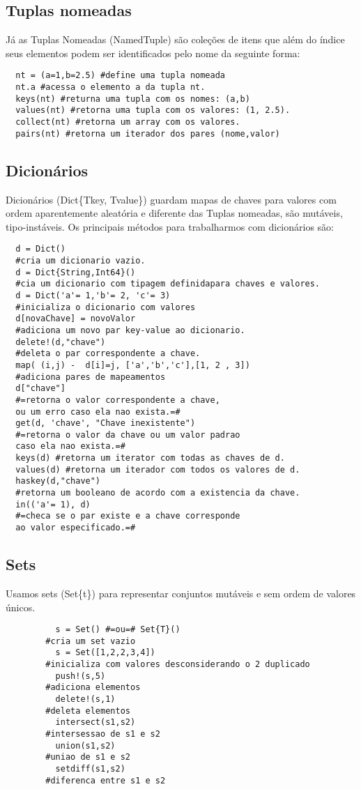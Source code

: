 \subsection{Tuplas nomeadas}
Já as Tuplas Nomeadas (NamedTuple) são coleções de itens que além do índice seus elementos podem ser identificados pelo nome da seguinte forma: 
\begin{lstlisting}
  nt = (a=1,b=2.5) #define uma tupla nomeada
  nt.a #acessa o elemento a da tupla nt.
  keys(nt) #returna uma tupla com os nomes: (a,b)
  values(nt) #retorna uma tupla com os valores: (1, 2.5).
  collect(nt) #retorna um array com os valores.
  pairs(nt) #retorna um iterador dos pares (nome,valor) 
\end{lstlisting}

\subsection{Dicionários}
Dicionários (Dict\{Tkey, Tvalue\}) guardam mapas de chaves para valores com ordem aparentemente aleatória e diferente das Tuplas nomeadas, são mutáveis, tipo-instáveis.
Os principais métodos para trabalharmos com dicionários são:
\begin{lstlisting}
  d = Dict() 
  #cria um dicionario vazio.
  d = Dict{String,Int64}() 
  #cia um dicionario com tipagem definidapara chaves e valores.
  d = Dict('a'= 1,'b'= 2, 'c'= 3) 
  #inicializa o dicionario com valores
  d[novaChave] = novoValor 
  #adiciona um novo par key-value ao dicionario.
  delete!(d,"chave") 
  #deleta o par correspondente a chave.
  map( (i,j) -  d[i]=j, ['a','b','c'],[1, 2 , 3]) 
  #adiciona pares de mapeamentos
  d["chave"] 
  #=retorna o valor correspondente a chave, 
  ou um erro caso ela nao exista.=#
  get(d, 'chave', "Chave inexistente") 
  #=retorna o valor da chave ou um valor padrao 
  caso ela nao exista.=# 
  keys(d) #retorna um iterator com todas as chaves de d.
  values(d) #retorna um iterador com todos os valores de d.
  haskey(d,"chave") 
  #retorna um booleano de acordo com a existencia da chave.
  in(('a'= 1), d) 
  #=checa se o par existe e a chave corresponde 
  ao valor especificado.=#

\end{lstlisting}

\subsection{Sets}
Usamos sets (Set\{t\}) para representar conjuntos mutáveis e sem ordem de valores únicos.
    \begin{lstlisting}
          s = Set() #=ou=# Set{T}() 
        #cria um set vazio
          s = Set([1,2,2,3,4]) 
        #inicializa com valores desconsiderando o 2 duplicado
          push!(s,5) 
        #adiciona elementos
          delete!(s,1)
        #deleta elementos
          intersect(s1,s2) 
        #intersessao de s1 e s2
          union(s1,s2) 
        #uniao de s1 e s2
          setdiff(s1,s2) 
        #diferenca entre s1 e s2
    \end{lstlisting}

